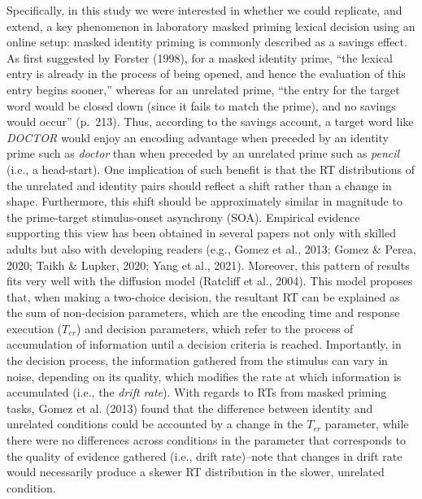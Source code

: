 \documentclass[
  english,
  man,floatsintext]{apa6}
\begin{document}
Specifically, in this study we were interested in whether we could replicate, and extend, a key phenomenon in laboratory masked priming lexical decision using an online setup: masked identity priming is commonly described as a savings effect. As first suggested by Forster (1998), for a masked identity prime, ``the lexical entry is already in the process of being opened, and hence the evaluation of this entry begins sooner,'' whereas for an unrelated prime, ``the entry for the target word would be closed down (since it fails to match the prime), and no savings would occur'' (p.~213). Thus, according to the savings account, a target word like \emph{DOCTOR} would enjoy an encoding advantage when preceded by an identity prime such as \emph{doctor} than when preceded by an unrelated prime such as \emph{pencil} (i.e., a head-start). One implication of such benefit is that the RT distributions of the unrelated and identity pairs should reflect a shift rather than a change in shape. Furthermore, this shift should be approximately similar in magnitude to the prime-target stimulus-onset asynchrony (SOA). Empirical evidence supporting this view has been obtained in several papers not only with skilled adults but also with developing readers (e.g., Gomez et al., 2013; Gomez \& Perea, 2020; Taikh \& Lupker, 2020; Yang et al., 2021). Moreover, this pattern of results fits very well with the diffusion model (Ratcliff et al., 2004). This model proposes that, when making a two-choice decision, the resultant RT can be explained as the sum of non-decision parameters, which are the encoding time and response execution (\(T_{er}\)) and decision parameters, which refer to the process of accumulation of information until a decision criteria is reached. Importantly, in the decision process, the information gathered from the stimulus can vary in noise, depending on its quality, which modifies the rate at which information is accumulated (i.e., the \emph{drift rate}). With regards to RTs from masked priming tasks, Gomez et al. (2013) found that the difference between identity and unrelated conditions could be accounted by a change in the \(T_{er}\) parameter, while there were no differences across conditions in the parameter that corresponds to the quality of evidence gathered (i.e., drift rate)--note that changes in drift rate would necessarily produce a skewer RT distribution in the slower, unrelated condition.
\end{document}
